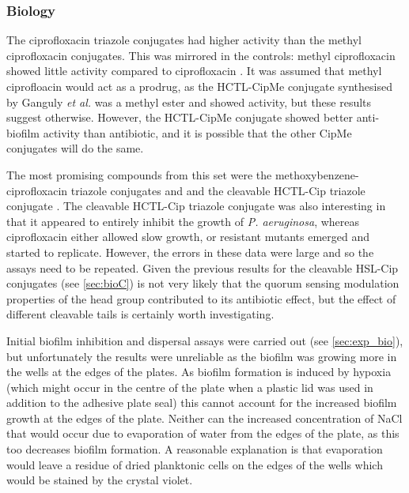 \subsubsection{Biology}

The ciprofloxacin triazole conjugates had higher activity than the methyl ciprofloxacin conjugates. This was mirrored in the controls: methyl ciprofloxacin  showed little activity compared to ciprofloxacin . It was assumed that methyl ciprofloacin  would act as a prodrug, as the HCTL-CipMe conjugate  synthesised by Ganguly \textit{et al.}\cite{Ganguly2011} was a methyl ester and showed activity, but these results suggest otherwise. However, the HCTL-CipMe conjugate  showed better anti-biofilm activity than antibiotic, and it is possible that the other CipMe conjugates will do the same.

The most promising compounds from this set were the methoxybenzene-ciprofloxacin triazole conjugates  and  and the cleavable HCTL-Cip triazole conjugate . 
The cleavable HCTL-Cip triazole conjugate  was also interesting in that it appeared to entirely inhibit the growth of \textit{P. aeruginosa}, whereas ciprofloxacin  either allowed slow growth, or resistant mutants emerged and started to replicate\cite{Su2010}.
However, the errors in these data were large and so the assays need to be repeated.
Given the previous results for the cleavable HSL-Cip conjugates (see \ref{sec:bioC}) is not very likely that the quorum sensing modulation properties of the head group contributed to its antibiotic effect, but the effect of different cleavable tails is certainly worth investigating.

Initial biofilm inhibition and dispersal assays were carried out (see \ref{sec:exp_bio}), but unfortunately the results were unreliable as the biofilm was growing more in the wells at the edges of the plates.
As biofilm formation is induced by hypoxia\cite{Ghotaslou2013} (which might occur in the centre of the plate when a plastic lid was used in addition to the adhesive plate seal) this cannot account for the increased biofilm growth at the edges of the plate. Neither can the increased concentration of NaCl that would occur due to evaporation of water from the edges of the plate, as this too decreases biofilm formation\cite{Bazire2007}. %
A reasonable explanation is that evaporation would leave a residue of dried planktonic cells on the edges of the wells which would be stained by the crystal violet.